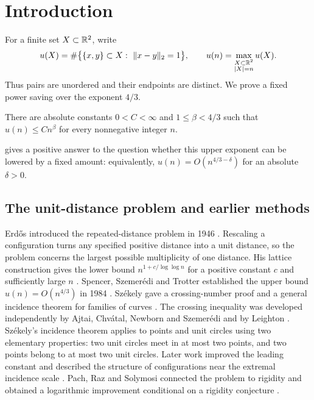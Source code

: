 \section{Introduction}\label{sec:introduction}

For a finite set \(X\subset\mathbb R^2\), write
\[
 u(X)=\#\bigl\{\{x,y\}\subset X:\ \norm{x-y}_2=1\bigr\},
 \qquad
 u(n)=\max_{\substack{X\subset\R^2\\ |X|=n}}u(X).
\]
Thus pairs are unordered and their endpoints are distinct. We prove a fixed
power saving over the exponent \(4/3\).

\begin{theorem}\label{thm:main}
There are absolute constants \(0<C<\infty\) and \(1\le\beta<4/3\) such that
\(u(n)\le Cn^\beta\) for every nonnegative integer \(n\).
\end{theorem}

 gives a positive answer to the question whether this upper
exponent can be lowered by a fixed amount: equivalently,
\(u(n)=O(n^{4/3-\delta})\) for an absolute \(\delta>0\).

\subsection{The unit-distance problem and earlier methods}

Erd\H{o}s introduced the repeated-distance problem in 1946
\cite{erdos1946}. Rescaling a configuration turns any specified positive
distance into a unit distance, so the problem concerns the largest possible
multiplicity of one distance. His lattice construction gives the lower bound
\(n^{1+c/\log\log n}\) for a positive constant \(c\) and sufficiently large
\(n\) \cite[Theorem~2]{erdos1946}.
Spencer, Szemer\'edi and Trotter established the upper bound
\(u(n)=O(n^{4/3})\) in 1984 \cite{sst1984}.
Sz\'ekely gave a crossing-number proof and a general incidence theorem
for families of curves \cite[Theorems~4 and~8]{Szekely1997}.
The crossing inequality was developed independently by Ajtai,
Chv\'atal, Newborn and Szemer\'edi and by Leighton
\cite{ajtaiEtAl1982,leighton1983}.
Sz\'ekely's incidence theorem applies to points and unit circles using two elementary
properties: two unit circles meet in at most two points, and two points
belong to at most two unit circles.
Later work improved the leading constant
\cite{agostonPalvolgyi2022} and described the structure of configurations
near the extremal incidence scale \cite{katzSilier2026}.
Pach, Raz and Solymosi connected the problem to rigidity and obtained
a logarithmic improvement conditional on a rigidity conjecture
\cite[Conjecture~7 and Theorem~8]{pachRazSolymosi2026}.

